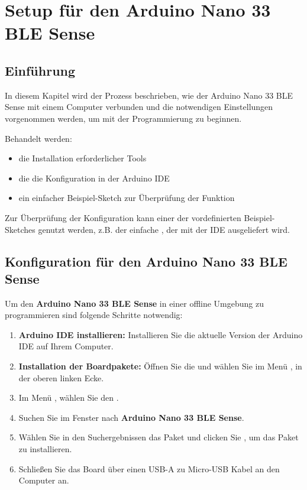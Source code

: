 %

%



\chapter{Setup für den Arduino Nano 33 BLE Sense}

\section{Einführung}

In diesem Kapitel wird der Prozess beschrieben, wie der Arduino Nano 33 BLE Sense mit einem Computer verbunden und die notwendigen Einstellungen vorgenommen werden, um mit der Programmierung zu beginnen.

Behandelt werden:
\begin{itemize}
	\item die Installation erforderlicher Tools
	\item die die Konfiguration in der Arduino IDE
	\item ein einfacher Beispiel-Sketch zur Überprüfung der Funktion
\end{itemize}

Zur Überprüfung der Konfiguration kann einer der vordefinierten Beispiel-Sketches genutzt werden, z.B. der einfache , der mit der IDE ausgeliefert wird.

\section{Konfiguration für den Arduino Nano 33 BLE Sense}

Um den \textbf{Arduino Nano 33 BLE Sense} in einer offline Umgebung zu programmieren sind folgende Schritte notwendig:

\begin{enumerate}
	\subsection{Installation des Treibers}
	\item \textbf{Arduino IDE installieren:} Installieren Sie die aktuelle Version der Arduino IDE auf Ihrem Computer.
	\item \textbf{Installation der Boardpakete:} Öffnen Sie die  und wählen Sie im Menü , in der oberen linken Ecke.
	\item Im Menü , wählen Sie den .
	\item Suchen Sie im Fenster  nach \textbf{Arduino Nano 33 BLE Sense}.
	\item Wählen Sie in den Suchergebnissen das Paket  und clicken Sie , um das Paket zu installieren.
	\item Schließen Sie das Board über einen USB-A zu Micro-USB Kabel an den Computer an.
\end{enumerate}

